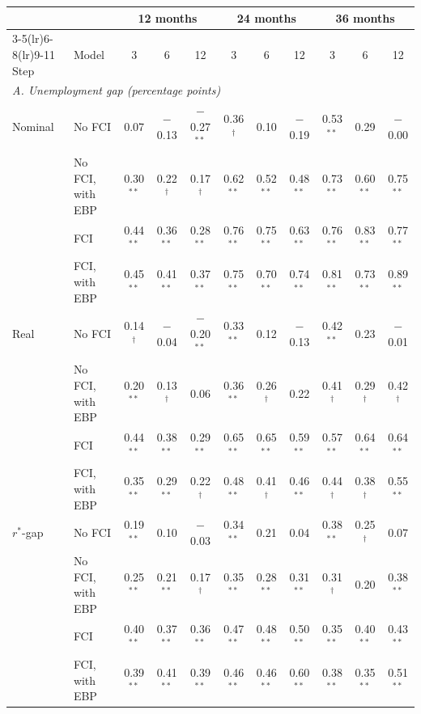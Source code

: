 \begin{tabular}{llccccccccc}
\toprule
 & & \multicolumn{3}{c}{12 months} & \multicolumn{3}{c}{24 months} & \multicolumn{3}{c}{36 months}\\
\cmidrule(lr){3-5}\cmidrule(lr){6-8}\cmidrule(lr){9-11}
Step & Model & 3 & 6 & 12 & 3 & 6 & 12 & 3 & 6 & 12 \\
\midrule
\multicolumn{11}{l}{\textit{A. Unemployment gap (percentage points)}}\\
Nominal & No FCI & 0.07 & $-$0.13 & $-$0.27$^{**}$ & 0.36$^{\dagger}$ & 0.10 & $-$0.19 & 0.53$^{**}$ & 0.29 & $-$0.00 \\
 & No FCI, with EBP & 0.30$^{**}$ & 0.22$^{\dagger}$ & 0.17$^{\dagger}$ & 0.62$^{**}$ & 0.52$^{**}$ & 0.48$^{**}$ & 0.73$^{**}$ & 0.60$^{**}$ & 0.75$^{**}$ \\
 & FCI & 0.44$^{**}$ & 0.36$^{**}$ & 0.28$^{**}$ & 0.76$^{**}$ & 0.75$^{**}$ & 0.63$^{**}$ & 0.76$^{**}$ & 0.83$^{**}$ & 0.77$^{**}$ \\
 & FCI, with EBP & 0.45$^{**}$ & 0.41$^{**}$ & 0.37$^{**}$ & 0.75$^{**}$ & 0.70$^{**}$ & 0.74$^{**}$ & 0.81$^{**}$ & 0.73$^{**}$ & 0.89$^{**}$ \\
Real & No FCI & 0.14$^{\dagger}$ & $-$0.04 & $-$0.20$^{**}$ & 0.33$^{**}$ & 0.12 & $-$0.13 & 0.42$^{**}$ & 0.23 & $-$0.01 \\
 & No FCI, with EBP & 0.20$^{**}$ & 0.13$^{\dagger}$ & 0.06 & 0.36$^{**}$ & 0.26$^{\dagger}$ & 0.22 & 0.41$^{\dagger}$ & 0.29$^{\dagger}$ & 0.42$^{\dagger}$ \\
 & FCI & 0.44$^{**}$ & 0.38$^{**}$ & 0.29$^{**}$ & 0.65$^{**}$ & 0.65$^{**}$ & 0.59$^{**}$ & 0.57$^{**}$ & 0.64$^{**}$ & 0.64$^{**}$ \\
 & FCI, with EBP & 0.35$^{**}$ & 0.29$^{**}$ & 0.22$^{\dagger}$ & 0.48$^{**}$ & 0.41$^{\dagger}$ & 0.46$^{**}$ & 0.44$^{\dagger}$ & 0.38$^{\dagger}$ & 0.55$^{**}$ \\
$r^*$-gap & No FCI & 0.19$^{**}$ & 0.10 & $-$0.03 & 0.34$^{**}$ & 0.21 & 0.04 & 0.38$^{**}$ & 0.25$^{\dagger}$ & 0.07 \\
 & No FCI, with EBP & 0.25$^{**}$ & 0.21$^{**}$ & 0.17$^{\dagger}$ & 0.35$^{**}$ & 0.28$^{**}$ & 0.31$^{**}$ & 0.31$^{\dagger}$ & 0.20 & 0.38$^{**}$ \\
 & FCI & 0.40$^{**}$ & 0.37$^{**}$ & 0.36$^{**}$ & 0.47$^{**}$ & 0.48$^{**}$ & 0.50$^{**}$ & 0.35$^{**}$ & 0.40$^{**}$ & 0.43$^{**}$ \\
 & FCI, with EBP & 0.39$^{**}$ & 0.41$^{**}$ & 0.39$^{**}$ & 0.46$^{**}$ & 0.46$^{**}$ & 0.60$^{**}$ & 0.38$^{**}$ & 0.35$^{**}$ & 0.51$^{**}$ \\

\end{tabular}
